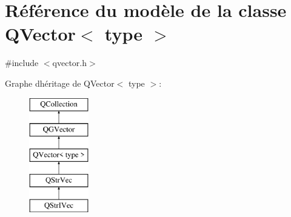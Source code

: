\hypertarget{class_q_vector}{}\section{Référence du modèle de la classe Q\+Vector$<$ type $>$}
\label{class_q_vector}


{\ttfamily \#include $<$qvector.\+h$>$}

Graphe d\textquotesingle{}héritage de Q\+Vector$<$ type $>$\+:\begin{figure}[H]
\begin{center}
\leavevmode
\includegraphics[height=5.000000cm]{class_q_vector}
\end{center}
\end{figure}
